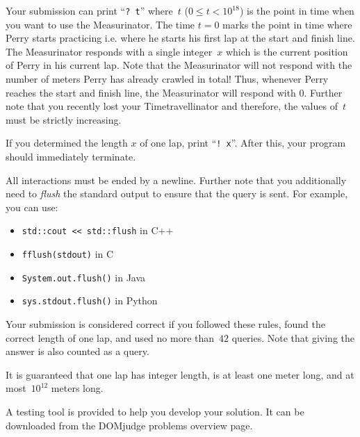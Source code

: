 \begin{Interaction}
	Your submission can print ``\texttt{?~t}'' where~$t$ ($0\leq t<10^{18}$) is the point in time when you want to use the Measurinator.
	The time $t=0$ marks the point in time where Perry starts practicing i.e. where he starts his first lap at the start and finish line.
	The Measurinator responds with a single integer~$x$ which is the current position of Perry in his current lap.
	Note that the Measurinator will not respond with the number of meters Perry has already crawled in total!
	Thus, whenever Perry reaches the start and finish line, the Measurinator will respond with $0$.
	Further note that you recently lost your Timetravellinator and therefore, the values of~$t$ must be strictly increasing.

	If you determined the length $x$ of one lap, print ``\texttt{!~x}''.
	After this, your program should immediately terminate.

	All interactions must be ended by a newline.
	Further note that you additionally need to \emph{flush} the standard output to ensure that the query is sent.
	For example, you can use:
	\begin{itemize}
		\item \texttt{std::cout <{}< std::flush} in C++
		\item \texttt{fflush(stdout)} in C
		\item \texttt{System.out.flush()} in Java
		\item \texttt{sys.stdout.flush()} in Python
	\end{itemize}

	Your submission is considered correct if you followed these rules, found the correct length of one lap, and used no more than~$42$ queries.
	Note that giving the answer is also counted as a query.

	It is guaranteed that one lap has integer length, is at least one meter long, and at most~$10^{12}$ meters long.

	A testing tool is provided to help you develop your solution. It can be downloaded from the DOMjudge problems overview page.
\end{Interaction}
\newpage